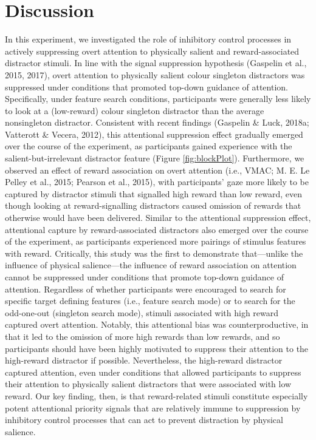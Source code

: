 \documentclass[jou, a4paper, noextraspace,floatsintext]{apa6}
\theoremstyle{definition}
\theoremstyle{definition}
\theoremstyle{definition}
\theoremstyle{remark}
\begin{document}
\section{Discussion}\label{discussion}

In this experiment, we investigated the role of inhibitory control
processes in actively suppressing overt attention to physically salient
and reward-associated distractor stimuli. In line with the signal
suppression hypothesis (Gaspelin et al., 2015, 2017), overt attention to
physically salient colour singleton distractors was suppressed under
conditions that promoted top-down guidance of attention. Specifically,
under feature search conditions, participants were generally less likely
to look at a (low-reward) colour singleton distractor than the average
nonsingleton distractor. Consistent with recent findings (Gaspelin \&
Luck, 2018a; Vatterott \& Vecera, 2012), this attentional suppression
effect gradually emerged over the course of the experiment, as
participants gained experience with the salient-but-irrelevant
distractor feature (Figure \ref{fig:blockPlot}). Furthermore, we
observed an effect of reward association on overt attention (i.e., VMAC;
M. E. Le Pelley et al., 2015; Pearson et al., 2015), with participants'
gaze more likely to be captured by distractor stimuli that signalled
high reward than low reward, even though looking at reward-signalling
distractors caused omission of rewards that otherwise would have been
delivered. Similar to the attentional suppression effect, attentional
capture by reward-associated distractors also emerged over the course of
the experiment, as participants experienced more pairings of stimulus
features with reward. Critically, this study was the first to
demonstrate that---unlike the influence of physical salience---the
influence of reward association on attention cannot be suppressed under
conditions that promote top-down guidance of attention. Regardless of
whether participants were encouraged to search for specific target
defining features (i.e., feature search mode) or to search for the
odd-one-out (singleton search mode), stimuli associated with high reward
captured overt attention. Notably, this attentional bias was
counterproductive, in that it led to the omission of more high rewards
than low rewards, and so participants should have been highly motivated
to suppress their attention to the high-reward distractor if possible.
Nevertheless, the high-reward distractor captured attention, even under
conditions that allowed participants to suppress their attention to
physically salient distractors that were associated with low reward. Our
key finding, then, is that reward-related stimuli constitute especially
potent attentional priority signals that are relatively immune to
suppression by inhibitory control processes that can act to prevent
distraction by physical salience.
\end{document}
